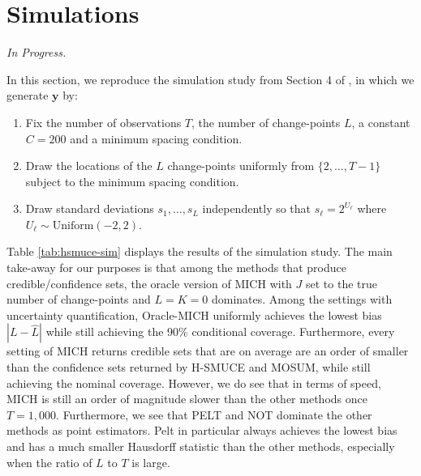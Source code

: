 \section{Simulations}
\label{sec:simulations}

\textit{In Progress.}

In this section, we reproduce the simulation study from Section 4 of \cite{Pein17}, in which we generate $\mathbf{y}$ by:
\begin{enumerate}
    \item Fix the number of observations $T$, the number of change-points $L$, a constant $C=200$ and a minimum spacing condition.
    \item Draw the locations of the $L$ change-points uniformly from $\{2, \ldots, T-1\}$ subject to the minimum spacing condition. 
    \item Draw standard deviations $s_1, \ldots, s_L$ independently so that $s_\ell = 2^{U_\ell}$ where $U_\ell \sim \text{Uniform}(-2,2)$.
\end{enumerate}



Table \ref{tab:hsmuce-sim} displays the results of the simulation study. The main take-away for our purposes is that among the methods that produce credible/confidence sets, the oracle version of MICH with $J$ set to the true number of change-points and $L=K=0$ dominates. Among the settings with uncertainty quantification, Oracle-MICH uniformly achieves the lowest bias $|L -\hat{L}|$ while still achieving the 90\% conditional coverage. Furthermore, every setting of MICH returns credible sets that are on average are an order of smaller than the confidence sets returned by H-SMUCE and MOSUM, while still achieving the nominal coverage. However, we do see that in terms of speed, MICH is still an order of magnitude slower than the other methods once $T = 1,000$. Furthermore, we see that PELT and NOT dominate the other methods as point estimators. Pelt in particular always achieves the lowest bias and has a much smaller Hausdorff statistic than the other methods, especially when the ratio of $L$ to $T$ is large. 

